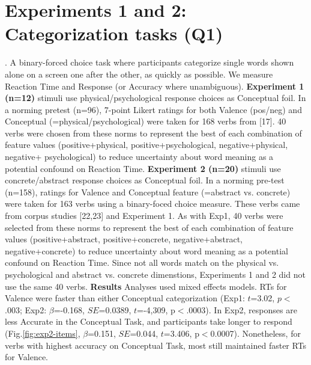 \section{Experiments 1 and 2: Categorization tasks (Q1)}. A binary-forced choice task where participants categorize single words shown alone on a screen one after the other, as quickly as possible. We measure Reaction Time and Response (or Accuracy where unambiguous). \textbf{Experiment 1 (n=12)} stimuli use physical/psychological response choices as Conceptual foil. In a norming pretest (n=96), 7-point Likert ratings for both Valence (pos/neg) and Conceptual (=physical/psychological) were taken for 168 verbs from [17]. 40 verbs were chosen from these norms to represent the best of each combination of feature values (positive+physical, positive+psychological, negative+physical, negative+ psychological) to reduce uncertainty about word meaning as a potential confound on Reaction Time. \textbf{Experiment 2 (n=20)} stimuli use concrete/abstract response choices as Conceptual foil. In a norming pre-test (n=158), ratings for Valence and Conceptual feature (=abstract vs. concrete) were taken for 163 verbs using a binary-foced choice measure. These verbs came from corpus studies [22,23] and Experiment 1. As with Exp1, 40 verbs were selected from these norms to represent the best of each combination of feature values (positive+abstract, positive+concrete, negative+abstract, negative+concrete) to reduce uncertainty about word meaning as a potential confound on Reaction Time. Since not all words match on the physical vs. psychological and abstract vs. concrete dimenstions, Experiments 1 and 2 did not use the same 40 verbs. \textbf{Results} Analyses used mixed effects models. RTs for Valence were faster than either Conceptual categorization (Exp1: $t$=3.02, $p<$.003; Exp2: $\beta$=-0.168, $SE$=0.0389, $t$=-4,309, p$<$.0003). In Exp2, responses are less Accurate in the Conceptual Task, and participants take longer to respond (Fig.\ref{fig:exp2-items}, $\beta$=0.151, $SE$=0.044, $t$=3.406, p$<$0.0007). Nonetheless, for verbs with highest accuracy on Conceptual Task, most still maintained faster RTs for Valence.\\

